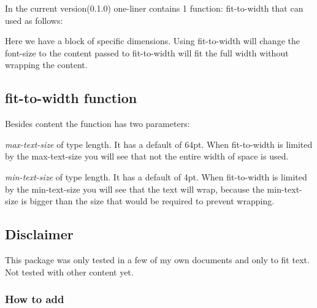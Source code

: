 In the current version(0.1.0) one-liner contains 1 function:
fit-to-width that can used as follows:

\begin{Shaded}
\begin{Highlighting}[]

\NormalTok{)}
\end{Highlighting}
\end{Shaded}

Here we have a block of specific dimensions. Using fit-to-width will
change the font-size to the content passed to fit-to-width will fit the
full width without wrapping the content.


\subsection{fit-to-width function}\label{fit-to-width-function}

Besides content the function has two parameters:

\emph{max-text-size} of type length. It has a default of 64pt. When
fit-to-width is limited by the max-text-size you will see that not the
entire width of space is used.

\emph{min-text-size} of type length. It has a default of 4pt. When
fit-to-width is limited by the min-text-size you will see that the text
will wrap, because the min-text-size is bigger than the size that would
be required to prevent wrapping.

\subsection{Disclaimer}\label{disclaimer}

This package was only tested in a few of my own documents and only to
fit text. Not tested with other content yet.

\subsubsection{How to add}\label{how-to-add}

